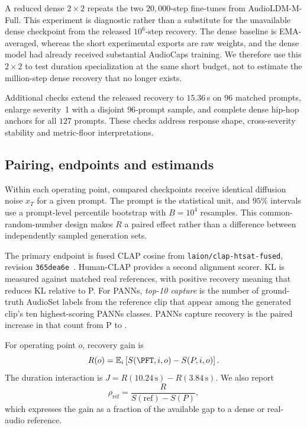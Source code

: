 A reduced dense $2\times2$ repeats the two $20{,}000$-step fine-tunes from AudioLDM-M-Full. This experiment is diagnostic rather than a substitute for the unavailable dense checkpoint from the released $10^{6}$-step recovery. The dense baseline is EMA-averaged, whereas the short experimental exports are raw weights, and the dense model had already received substantial AudioCaps training. We therefore use this $2\times2$ to test duration specialization at the same short budget, not to estimate the million-step dense recovery that no longer exists.

Additional checks extend the released recovery to $15.36$\,s on $96$ matched prompts, enlarge severity~1 with a disjoint $96$-prompt sample, and complete dense hip-hop anchors for all $127$ prompts. These checks address response shape, cross-severity stability and metric-floor interpretations.

\subsection{Pairing, endpoints and estimands}
Within each operating point, compared checkpoints receive identical diffusion noise $x_T$ for a given prompt. The prompt is the statistical unit, and $95\%$ intervals use a prompt-level percentile bootstrap with $B=10^{4}$ resamples. This common-random-number design makes $R$ a paired effect rather than a difference between independently sampled generation sets.

The primary endpoint is fused CLAP cosine from \texttt{laion/\allowbreak clap-htsat-fused}, revision \texttt{365dea6e}~\cite{wu2023clap}. Human-CLAP provides a second alignment scorer. KL is measured against matched real references, with positive recovery meaning that \PFT{} reduces KL relative to P. For PANNs, \emph{top-10 capture} is the number of ground-truth AudioSet labels from the reference clip that appear among the generated clip's ten highest-scoring PANNs classes. PANNs capture recovery is the paired increase in that count from P to \PFT{}.

For operating point $o$, recovery gain is
\begin{equation}
R(o)=\mathbb{E}_{i}\left[S(\PFT,i,o)-S(P,i,o)\right].
\end{equation}
The duration interaction is $J=R(10.24\,\mathrm{s})-R(3.84\,\mathrm{s})$. We also report
\begin{equation}
\rho_{\mathrm{ref}}=\frac{R}{S(\mathrm{ref})-S(P)},
\end{equation}
which expresses the gain as a fraction of the available gap to a dense or real-audio reference.

